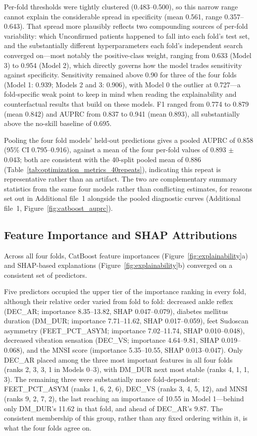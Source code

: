 \documentclass[pdflatex,sn-mathphys-num]{sn-jnl}%
\theoremstyle{thmstyleone}%
\theoremstyle{thmstyletwo}%
\theoremstyle{thmstylethree}%
\begin{document}
Per-fold thresholds were tightly clustered (0.483--0.500), so this narrow range cannot explain the
considerable spread in specificity (mean 0.561, range 0.357--0.643). That spread more plausibly
reflects two compounding sources of per-fold variability: which Unconfirmed patients happened to fall
into each fold's test set, and the substantially different hyperparameters each fold's independent
search converged on---most notably the positive-class weight, ranging from 0.633 (Model 3) to 0.954
(Model 2), which directly governs how the model trades sensitivity against specificity. Sensitivity
remained above 0.90 for three of the four folds (Model 1: 0.939; Models 2 and 3: 0.906), with Model 0
the outlier at 0.727---a fold-specific weak point to keep in mind when reading the explainability and
counterfactual results that build on these models. F1 ranged from 0.774 to 0.879 (mean 0.842) and
AUPRC from 0.837 to 0.941 (mean 0.893), all substantially above the no-skill baseline of 0.695.

Pooling the four fold models' held-out predictions gives a pooled AUPRC of 0.858 (95\% CI
0.795--0.916), against a mean of the four per-fold values of 0.893 $\pm$ 0.043; both are consistent
with the 40-split pooled mean of 0.886 (Table~\ref{tab:optimization_metrics_40repeats}), indicating
this repeat is representative rather than an artifact. The two are complementary summary statistics
from the same four models rather than conflicting estimates, for reasons set out in Additional
file~1 alongside the pooled diagnostic curves (Additional file~1, Figure~\ref{fig:catboost_auprc}).

\subsection{Feature Importance and SHAP Attributions}
\label{sec:results-importance}
Across all four folds, CatBoost feature importances (Figure~\ref{fig:explainability}a) and SHAP-based explanations (Figure~\ref{fig:explainability}b) converged on a consistent set of predictors.

Five predictors occupied the upper tier of the importance ranking in every fold, although their relative order varied from fold to fold: decreased ankle reflex (DEC\_AR; importance 8.35--13.82, SHAP 0.047--0.079), diabetes mellitus duration (DM\_DUR; importance 7.71--11.62, SHAP 0.017--0.059), feet Sudoscan asymmetry (FEET\_PCT\_ASYM; importance 7.02--11.74, SHAP 0.010--0.048), decreased vibration sensation (DEC\_VS; importance 4.64--9.81, SHAP 0.019--0.068), and the MNSI score (importance 5.35--10.55, SHAP 0.013--0.047). Only DEC\_AR placed among the three most important features in all four folds (ranks 2, 3, 3, 1 in Models 0--3), with DM\_DUR next most stable (ranks 4, 1, 1, 3). The remaining three were substantially more fold-dependent: FEET\_PCT\_ASYM (ranks 1, 6, 2, 6), DEC\_VS (ranks 3, 4, 5, 12), and MNSI (ranks 9, 2, 7, 2), the last reaching an importance of 10.55 in Model 1---behind only DM\_DUR's 11.62 in that fold, and ahead of DEC\_AR's 9.87. The consistent membership of this group, rather than any fixed ordering within it, is what the four folds agree on.
\end{document}
